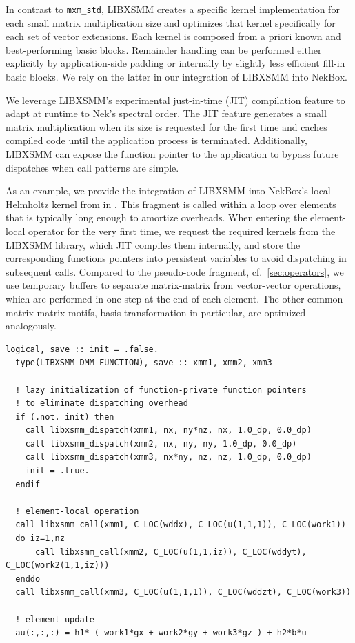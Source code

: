 In contrast to \texttt{mxm\_std}, LIBXSMM creates a specific kernel implementation for each small matrix multiplication size and optimizes that kernel specifically for each set of vector extensions.
Each kernel is composed from a priori known and best-performing basic blocks.  
Remainder handling can be performed either explicitly by application-side padding or internally by slightly less efficient fill-in basic blocks. 
We rely on the latter in our integration of LIBXSMM into NekBox. 

We leverage LIBXSMM's experimental just-in-time (JIT) compilation feature to adapt at runtime to Nek's spectral order. 
The JIT feature generates a small matrix multiplication when its size is requested for the first time and caches compiled code until the application process is terminated. 
Additionally, LIBXSMM can expose the function pointer to the application to bypass future dispatches when call patterns are simple. 

As an example, we provide the integration of LIBXSMM into NekBox's local Helmholtz kernel from  in .
This fragment is called within a loop over elements that is typically long enough to amortize overheads. 
When entering the element-local operator for the very first time, we request the required kernels from the LIBXSMM library, which JIT compiles them internally, and store the corresponding functions pointers into persistent variables to avoid dispatching in subsequent calls. 
Compared to the pseudo-code fragment, cf.~\ref{sec:operators}, we use temporary buffers to separate matrix-matrix from vector-vector operations, which are performed in one step at the end of each element.
The other common matrix-matrix motifs, basis transformation in particular, are optimized analogously. 

\begin{lstlisting}[float,
  caption={Integration of LIBXSMM into NekBox's element-local Helmholtz operator. \texttt{xmm1, xmm2, xmm3} are persistent
  functions pointers to amortize LIBXSMM's dispatching overhead. The \texttt{libxsmm\_dispatch} call JITs the requested kernel and 
  populates the persistent function pointers.},
  label=lst:int_axhm]
  logical, save :: init = .false.
  type(LIBXSMM_DMM_FUNCTION), save :: xmm1, xmm2, xmm3

  ! lazy initialization of function-private function pointers
  ! to eliminate dispatching overhead
  if (.not. init) then
    call libxsmm_dispatch(xmm1, nx, ny*nz, nx, 1.0_dp, 0.0_dp)
    call libxsmm_dispatch(xmm2, nx, ny, ny, 1.0_dp, 0.0_dp)
    call libxsmm_dispatch(xmm3, nx*ny, nz, nz, 1.0_dp, 0.0_dp)
    init = .true.
  endif

  ! element-local operation
  call libxsmm_call(xmm1, C_LOC(wddx), C_LOC(u(1,1,1)), C_LOC(work1))
  do iz=1,nz
      call libxsmm_call(xmm2, C_LOC(u(1,1,iz)), C_LOC(wddyt), C_LOC(work2(1,1,iz)))
  enddo
  call libxsmm_call(xmm3, C_LOC(u(1,1,1)), C_LOC(wddzt), C_LOC(work3))

  ! element update
  au(:,:,:) = h1* ( work1*gx + work2*gy + work3*gz ) + h2*b*u
\end{lstlisting}

